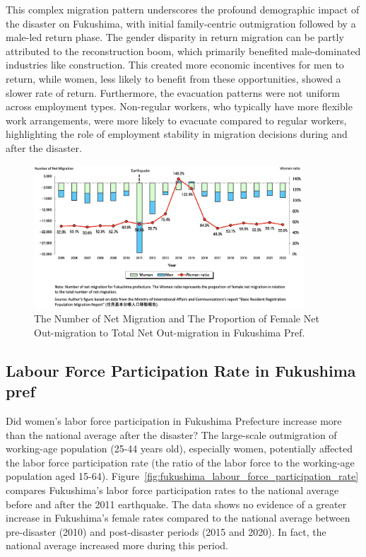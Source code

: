 \documentclass[a4paper,12pt]{article}
\begin{document}
This complex migration pattern underscores the profound demographic impact of the disaster on Fukushima, with initial family-centric outmigration followed by a male-led return phase. The gender disparity in return migration can be partly attributed to the reconstruction boom, which primarily benefited male-dominated industries like construction. This created more economic incentives for men to return, while women, less likely to benefit from these opportunities, showed a slower rate of return. Furthermore, the evacuation patterns were not uniform across employment types. Non-regular workers, who typically have more flexible work arrangements, were more likely to evacuate compared to regular workers, highlighting the role of employment stability in migration decisions during and after the disaster.


\begin{figure}[h!]
    \centering
    \includegraphics[width=0.9\textwidth]{Number of net migration.jpeg}  %
    \caption{The Number of Net Migration and The Proportion of Female Net Out-migration to Total Net Out-migration in Fukushima Pref.}
    \label{fig:number_of_net_migration}
\end{figure}

\clearpage

\subsection{Labour Force Participation Rate in Fukushima pref}
\label{sec4.1}


Did women's labor force participation in Fukushima Prefecture increase more than the national average after the disaster?
The large-scale outmigration of working-age population (25-44 years old), especially women, potentially affected the labor force participation rate (the ratio of the labor force to the working-age population aged 15-64). Figure~\ref{fig:fukushima_labour_force_participation_rate} compares Fukushima's labor force participation rates to the national average before and after the 2011 earthquake. The data shows no evidence of a greater increase in Fukushima's female rates compared to the national average between pre-disaster (2010) and post-disaster periods (2015 and 2020). In fact, the national average increased more during this period.
\end{document}
